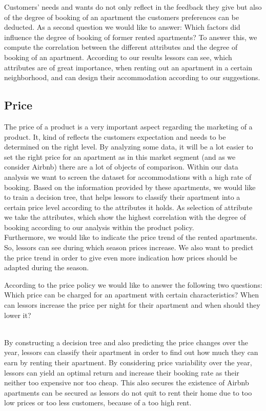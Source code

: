 Customers’ needs and wants do not only reflect in the feedback they give but also of the degree of booking of an apartment the customers preferences can be deducted. As a second question we would like to answer: Which factors did influence the degree of booking of former rented apartments? To answer this, we compute the correlation between the different attributes and the degree of booking of an apartment. According to our results lessors can see, which attributes are of great importance, when renting out an apartment in a certain neighborhood, and can design their accommodation according to our suggestions. 

\subsection{Price}
\noindent The price of a product is a very important aspect regarding the marketing of a product. It, kind of reflects the customers expectation and needs to be determined on the right level. By analyzing some data, it will be a lot easier to set the right price for an apartment as in this market segment (and as we consider Airbnb) there are a lot of objects of comparison. Within our data analysis we want to screen the dataset for accommodations with a high rate of booking. Based on the information provided by these apartments, we would like to train a decision tree, that helps lessors to classify their apartment into a certain price level according to the attributes it holds. As selection of attribute we take the attributes, which show the highest correlation with the degree of booking according to our analysis within the product policy.\\ Furthermore, we would like to indicate the price trend of the rented apartments. So, lessors can see during which season prices increase. We also want to predict the price trend in order to give even more indication how prices should be adapted during the season.\\
\begin{itshape}
According to the price policy we would like to answer the following two questions: Which price can be charged for an apartment with certain characteristics? When can lessors increase the price per night for their apartment and when should they lower it?
\end{itshape}
\\By constructing a decision tree and also predicting the price changes over the year, lessors can classify their apartment in order to find out how much they can earn by renting their apartment. By considering price variability over the year, lessors can yield an optimal return and increase their booking rate as their neither too expensive nor too cheap. This also secures the existence of Airbnb apartments can be secured as lessors do not quit to rent their home due to too low prices or too less customers, because of a too high rent.
